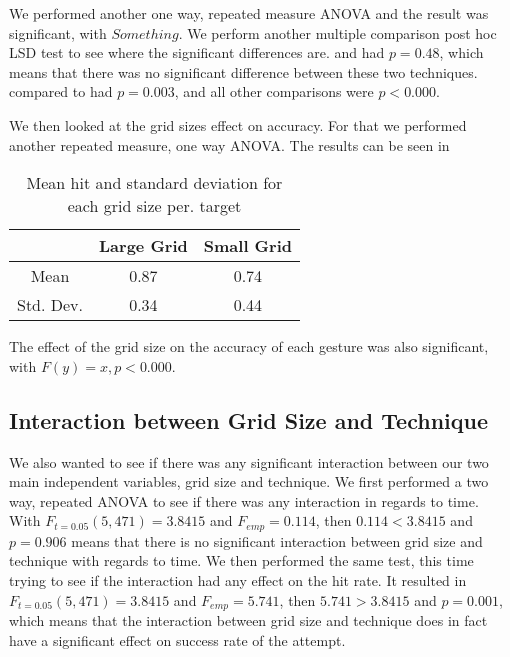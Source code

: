 We performed another one way, repeated measure ANOVA and the result was significant, with $Something$. We perform another multiple comparison post hoc LSD test to see where the significant differences are. \pinch and \tilt had $p=0.48$, which means that there was no significant difference between these two techniques. \swipe compared to \throw had $p=0.003$, and all other comparisons were $p<0.000$. 

We then looked at the grid sizes effect on accuracy. For that we performed another repeated measure, one way ANOVA. The results can be seen in 

\begin{table}[H]
	\centering
	\begin{tabular}{|c|c|c|}
		\hline
		\rowcolor[HTML]{9B9B9B} 
		& \textbf{Large Grid} & \textbf{Small Grid} \\ \hline
		Mean & 0.87 & 0.74 \\ \hline
		Std. Dev. & 0.34 & 0.44 \\ \hline
		\end{tabular}
		\caption{Mean hit and standard deviation for each grid size per. target}
		\label{tab:meanHitSize}
\end{table}

The effect of the grid size on the accuracy of each gesture was also significant, with $F(y) = x, p<0.000$.

\subsection{Interaction between Grid Size and Technique}
We also wanted to see if there was any significant interaction between our two main independent variables, grid size and technique. 
We first performed a two way, repeated ANOVA to see if there was any interaction in regards to time. With $F_{t=0.05}(5,471)=3.8415$ and $F_{emp}= 0.114$, then $0.114 < 3.8415$ and $p=0.906$ means that there is no significant interaction between grid size and technique with regards to time. We then performed the same test, this time trying to see if the interaction had any effect on the hit rate. It resulted in $F_{t=0.05}(5,471)=3.8415$ and $F_{emp}=5.741$, then $5.741 > 3.8415$ and $p=0.001$, which means that the interaction between grid size and technique does in fact have a significant effect on success rate of the attempt. 